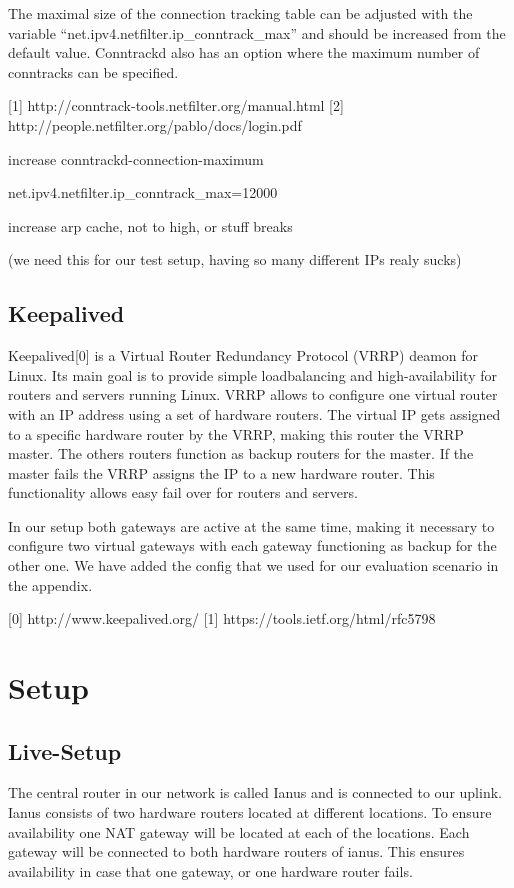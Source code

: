 The maximal size of the connection tracking table can be adjusted with
the variable ``net.ipv4.netfilter.ip\_conntrack\_max'' and should be
increased from the default value. Conntrackd also has an option where
the maximum number of conntracks can be specified.

{[}1{]} http://conntrack-tools.netfilter.org/manual.html {[}2{]}
http://people.netfilter.org/pablo/docs/login.pdf

increase conntrackd-connection-maximum

net.ipv4.netfilter.ip\_conntrack\_max=12000

increase arp cache, not to high, or stuff breaks

(we need this for our test setup, having so many different IPs realy
sucks)

\subsection{Keepalived}\label{keepalived}

Keepalived{[}0{]} is a Virtual Router Redundancy Protocol (VRRP) deamon
for Linux. Its main goal is to provide simple loadbalancing and
high-availability for routers and servers running Linux. VRRP allows to
configure one virtual router with an IP address using a set of hardware
routers. The virtual IP gets assigned to a specific hardware router by
the VRRP, making this router the VRRP master. The others routers
function as backup routers for the master. If the master fails the VRRP
assigns the IP to a new hardware router. This functionality allows easy
fail over for routers and servers.

In our setup both gateways are active at the same time, making it
necessary to configure two virtual gateways with each gateway
functioning as backup for the other one. We have added the config that
we used for our evaluation scenario in the appendix.

{[}0{]} http://www.keepalived.org/ {[}1{]}
https://tools.ietf.org/html/rfc5798

\section{Setup}\label{setup}

\subsection{Live-Setup}\label{live-setup}

The central router in our network is called Ianus and is connected to
our uplink. Ianus consists of two hardware routers located at different
locations. To ensure availability one NAT gateway will be located at
each of the locations. Each gateway will be connected to both hardware
routers of ianus. This ensures availability in case that one gateway, or
one hardware router fails.

